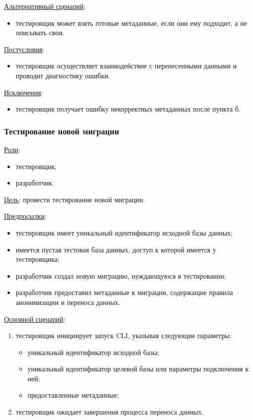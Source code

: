 \underline{Альтернативный сценарий}:

\begin{itemize}
    \item тестировщик может взять готовые метаданные, если они ему подходит, а не описывать свои.
\end{itemize}

\underline{Постусловия}:

\begin{itemize}
    \item тестировщик осуществляет взаимодействие с перенесенными данными и проводит диагностику ошибки.
\end{itemize}

\underline{Исключения}:

\begin{itemize}
    \item тестировщик получает ошибку некорректных метаданных после пункта б.
\end{itemize}


\subsubsection{Тестирование новой миграции}

\underline{Роли}:

\begin{itemize}
    \item тестировщик;
    \item разработчик.
\end{itemize}

\underline{Цель}: провести тестирование новой миграции.

\underline{Предпосылки}:

\begin{itemize}
    \item тестировщик имеет уникальный идентификатор исходной базы данных;
    \item имеется пустая тестовая база данных, доступ к которой имеется у тестировщика;
    \item разработчик создал новую миграцию, нуждающуюся в тестировании;
    \item разработчик предоставил метаданные к миграции, содержащие правила анонимизации и переноса данных.
\end{itemize}

\underline{Основной сценарий}:

\begin{enumerate}
    \item тестировщик инициирует запуск CLI, указывая следующие параметры:
    \begin{itemize}
        \item уникальный идентификатор исходной базы;
        \item уникальный идентификатор целевой базы или параметры подключения к ней;
        \item предоставленные метаданные;
    \end{itemize}
    \item тестировщик ожидает завершения процесса переноса данных.
\end{enumerate}

